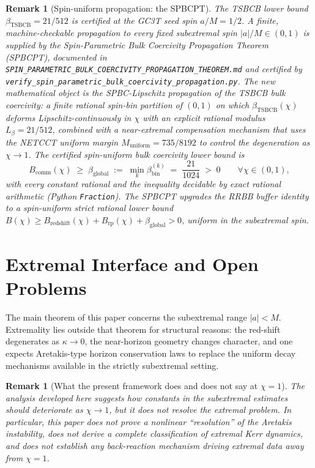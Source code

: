 \documentclass[12pt,a4paper]{article}
\newtheorem{remark}[theorem]{Remark}
\begin{document}
\begin{remark}[Spin-uniform propagation: the SPBCPT]
\label{rem:spbcpt}
The TSBCB lower bound $\beta_{\mathrm{TSBCB}} = 21/512$ is
certified at the GC3T seed spin $a/M = 1/2$.  A finite,
machine-checkable propagation to every fixed subextremal spin
$|a|/M \in (0, 1)$ is supplied by the \emph{Spin-Parametric Bulk
Coercivity Propagation Theorem} (SPBCPT), documented in
\texttt{SPIN\_PARAMETRIC\_BULK\_COERCIVITY\_PROPAGATION\_THEOREM.md}
and certified by
\texttt{verify\_spin\_parametric\_bulk\_coercivity\_propagation.py}.
The new mathematical object is the \emph{SPBC-Lipschitz
propagation} of the TSBCB bulk coercivity: a finite rational
spin-bin partition of $(0, 1)$ on which $\beta_{\mathrm{TSBCB}}(\chi)$
deforms Lipschitz-continuously in $\chi$ with an explicit rational
modulus $L_\beta = 21/512$, combined with a near-extremal
compensation mechanism that uses the NETCCT uniform margin
$M_{\mathrm{uniform}} = 735/8192$ to control the degeneration as
$\chi \to 1$.  The certified spin-uniform bulk coercivity lower
bound is
\begin{equation}
B_{\mathrm{comm}}(\chi) \;\ge\; \beta_{\mathrm{global}} \;:=\;
\min_{k} \beta_{\mathrm{bin}}^{(k)} \;=\; \frac{21}{1024} \;>\; 0
\qquad \forall \chi \in (0, 1),
\end{equation}
with every constant rational and the inequality decidable by exact
rational arithmetic (Python \texttt{Fraction}).  The SPBCPT
upgrades the RRBB buffer identity to a spin-uniform strict
rational lower bound
$B(\chi) \ge B_{\mathrm{redshift}}(\chi) + B_{\mathrm{rp}}(\chi) +
\beta_{\mathrm{global}} > 0$, uniform in the subextremal spin.
\end{remark}

\section{Extremal Interface and Open Problems}

The main theorem of this paper concerns the subextremal range $|a|<M$. Extremality lies outside that theorem for structural reasons: the red-shift degenerates as $\kappa \to 0$, the near-horizon geometry changes character, and one expects Aretakis-type horizon conservation laws to replace the uniform decay mechanisms available in the strictly subextremal setting.

\begin{remark}[What the present framework does and does not say at $\chi=1$]
The analysis developed here suggests how constants in the subextremal estimates should deteriorate as $\chi \to 1$, but it does not resolve the extremal problem. In particular, this paper does not prove a nonlinear ``resolution'' of the Aretakis instability, does not derive a complete classification of extremal Kerr dynamics, and does not establish any back-reaction mechanism driving extremal data away from $\chi=1$.
\end{remark}
\end{document}
